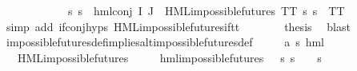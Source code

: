 \begin{isabellebody}
\isanewline
\ \ \ \ \isamarkupfalse%
\ {}\isanewline
\ \ \ \ \isamarkupfalse%
\ {\isachardoublequoteopen}{\isasymforall}s{\isachardot}{\kern0pt}\ s\ {\isasymTurnstile}\ {\isacharparenleft}{\kern0pt}hml{\isacharunderscore}{\kern0pt}conj\ I\ J\ {\isasymPhi}{\isacharparenright}{\kern0pt}{\isachardoublequoteclose}\ {\isachardoublequoteopen}HML{\isacharunderscore}{\kern0pt}impossible{\isacharunderscore}{\kern0pt}futures\ TT{\isachardoublequoteclose}\ {\isachardoublequoteopen}{\isasymforall}s{\isachardot}{\kern0pt}\ s\ {\isasymTurnstile}\ TT{\isachardoublequoteclose}\ \isanewline
\ \ \ \ \ \ \isamarkupfalse%
\ {\isacharparenleft}{\kern0pt}simp\ add{\isacharcolon}{\kern0pt}\ if{\isacharunderscore}{\kern0pt}conj{\isachardot}{\kern0pt}hyps{\isacharparenleft}{\kern0pt}{}{\isacharparenright}{\kern0pt}\ HML{\isacharunderscore}{\kern0pt}impossible{\isacharunderscore}{\kern0pt}futures{\isachardot}{\kern0pt}if{\isacharunderscore}{\kern0pt}tt{\isacharparenright}{\kern0pt}{\isacharplus}{\kern0pt}\isanewline
\ \ \ \ \isamarkupfalse%
\ \isamarkupfalse%
\ {\isacharquery}{\kern0pt}thesis\ \isamarkupfalse%
\ blast\isanewline
\ \ \isamarkupfalse%
\ \isanewline
{}\isamarkupfalse%
%
\endisatagproof
{\isafoldproof}%
%
\isadelimproof
\isanewline
%
\endisadelimproof
\isanewline
{}\isamarkupfalse%
\ impossible{\isacharunderscore}{\kern0pt}futures{\isacharunderscore}{\kern0pt}def{\isacharunderscore}{\kern0pt}implies{\isacharunderscore}{\kern0pt}alt{\isacharunderscore}{\kern0pt}impossible{\isacharunderscore}{\kern0pt}futures{\isacharunderscore}{\kern0pt}def{\isacharcolon}{\kern0pt}\isanewline
\ \ \ {\isasymphi}\ {\isacharcolon}{\kern0pt}{\isacharcolon}{\kern0pt}\ {\isachardoublequoteopen}{\isacharparenleft}{\kern0pt}{\isacharprime}{\kern0pt}a{\isacharcomma}{\kern0pt}\ {\isacharprime}{\kern0pt}s{\isacharparenright}{\kern0pt}\ hml{\isachardoublequoteclose}\isanewline
\ \ \ {\isachardoublequoteopen}HML{\isacharunderscore}{\kern0pt}impossible{\isacharunderscore}{\kern0pt}futures\ {\isasymphi}{\isachardoublequoteclose}\isanewline
\ \ \ {\isachardoublequoteopen}{\isasymexists}{\isasympsi}{\isachardot}{\kern0pt}\ hml{\isacharunderscore}{\kern0pt}impossible{\isacharunderscore}{\kern0pt}futures\ {\isasympsi}\ {\isasymand}\ {\isacharparenleft}{\kern0pt}{\isasymforall}s{\isachardot}{\kern0pt}\ {\isacharparenleft}{\kern0pt}s\ {\isasymTurnstile}\ {\isasymphi}{\isacharparenright}{\kern0pt}\ {\isasymlongleftrightarrow}\ {\isacharparenleft}{\kern0pt}s\ {\isasymTurnstile}\ {\isasympsi}{\isacharparenright}{\kern0pt}{\isacharparenright}{\kern0pt}{\isachardoublequoteclose}\isanewline

\end{isabellebody}
